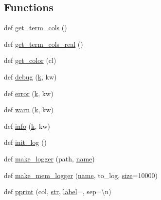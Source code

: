 \subsection*{Functions}
\begin{DoxyCompactItemize}
\item 
def \hyperlink{namespacewaflib_1_1_logs_a53026f26ec1fca7ea3115b70beb74e43}{get\+\_\+term\+\_\+cols} ()
\item 
def \hyperlink{namespacewaflib_1_1_logs_a7d3f15e7642ca6704c20f93785c258a7}{get\+\_\+term\+\_\+cols\+\_\+real} ()
\item 
def \hyperlink{namespacewaflib_1_1_logs_a6b3347689827b58479ced498128080db}{get\+\_\+color} (cl)
\item 
def \hyperlink{namespacewaflib_1_1_logs_a3f5a70f19cd606d1392a04634c591004}{debug} (\hyperlink{rfft2d_test_m_l_8m_adc468c70fb574ebd07287b38d0d0676d}{k}, kw)
\item 
def \hyperlink{namespacewaflib_1_1_logs_a8a43c07202381c093d206d015faca5c6}{error} (\hyperlink{rfft2d_test_m_l_8m_adc468c70fb574ebd07287b38d0d0676d}{k}, kw)
\item 
def \hyperlink{namespacewaflib_1_1_logs_acfc4c59a3011ba34982faddeba664944}{warn} (\hyperlink{rfft2d_test_m_l_8m_adc468c70fb574ebd07287b38d0d0676d}{k}, kw)
\item 
def \hyperlink{namespacewaflib_1_1_logs_ac9b7edb9e6c457b63ece38ca8c8e8b26}{info} (\hyperlink{rfft2d_test_m_l_8m_adc468c70fb574ebd07287b38d0d0676d}{k}, kw)
\item 
def \hyperlink{namespacewaflib_1_1_logs_a8c96ad6b70b70bfcad1cabcbd3bfb7f2}{init\+\_\+log} ()
\item 
def \hyperlink{namespacewaflib_1_1_logs_a2fd9a8aa35484b2713521360a73fd8ca}{make\+\_\+logger} (path, \hyperlink{lib_2expat_8h_a1b49b495b59f9e73205b69ad1a2965b0}{name})
\item 
def \hyperlink{namespacewaflib_1_1_logs_a1926b8bfe3fe67b05ece81eb4d7caeb2}{make\+\_\+mem\+\_\+logger} (\hyperlink{lib_2expat_8h_a1b49b495b59f9e73205b69ad1a2965b0}{name}, to\+\_\+log, \hyperlink{group__lavu__mem_ga854352f53b148adc24983a58a1866d66}{size}=10000)
\item 
def \hyperlink{namespacewaflib_1_1_logs_a70506c528cabfbae02b10e4568bfbc5d}{pprint} (col, \hyperlink{sndfile__save_8m_a4b99ff73a8a869319570237b5c57ab03}{str}, \hyperlink{_tags_8cpp_a0a3345b0d4574d7adffe113dacd8ccec}{label}=\textquotesingle{}\textquotesingle{}, sep=\textquotesingle{}\textbackslash{}n\textquotesingle{})
\end{DoxyCompactItemize}
